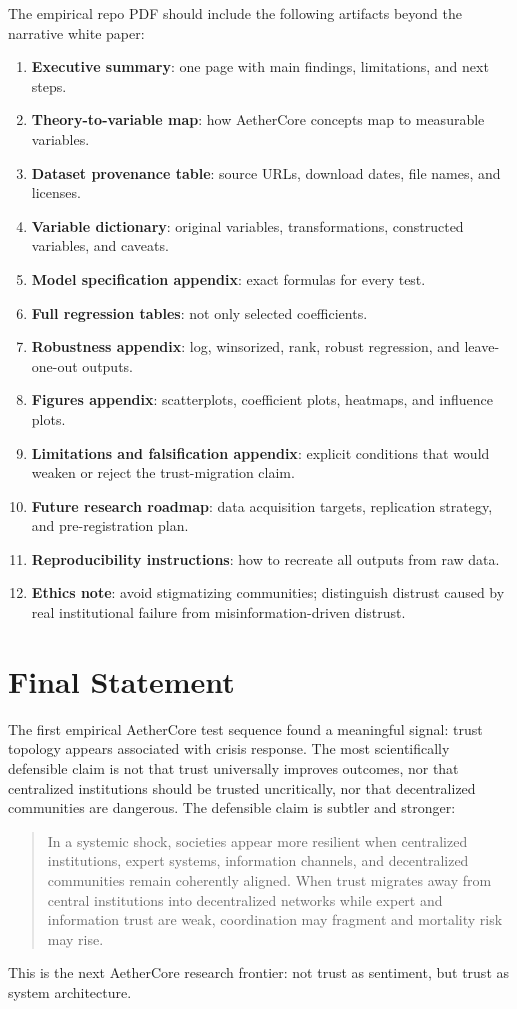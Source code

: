 \documentclass[12pt]{article}
\begin{document}
The empirical repo PDF should include the following artifacts beyond the narrative white paper:

\begin{enumerate}
  \item \textbf{Executive summary}: one page with main findings, limitations, and next steps.
  \item \textbf{Theory-to-variable map}: how AetherCore concepts map to measurable variables.
  \item \textbf{Dataset provenance table}: source URLs, download dates, file names, and licenses.
  \item \textbf{Variable dictionary}: original variables, transformations, constructed variables, and caveats.
  \item \textbf{Model specification appendix}: exact formulas for every test.
  \item \textbf{Full regression tables}: not only selected coefficients.
  \item \textbf{Robustness appendix}: log, winsorized, rank, robust regression, and leave-one-out outputs.
  \item \textbf{Figures appendix}: scatterplots, coefficient plots, heatmaps, and influence plots.
  \item \textbf{Limitations and falsification appendix}: explicit conditions that would weaken or reject the trust-migration claim.
  \item \textbf{Future research roadmap}: data acquisition targets, replication strategy, and pre-registration plan.
  \item \textbf{Reproducibility instructions}: how to recreate all outputs from raw data.
  \item \textbf{Ethics note}: avoid stigmatizing communities; distinguish distrust caused by real institutional failure from misinformation-driven distrust.
\end{enumerate}

\section*{Final Statement}

The first empirical AetherCore test sequence found a meaningful signal: trust topology appears associated with crisis response. The most scientifically defensible claim is not that trust universally improves outcomes, nor that centralized institutions should be trusted uncritically, nor that decentralized communities are dangerous. The defensible claim is subtler and stronger:

\begin{quote}
In a systemic shock, societies appear more resilient when centralized institutions, expert systems, information channels, and decentralized communities remain coherently aligned. When trust migrates away from central institutions into decentralized networks while expert and information trust are weak, coordination may fragment and mortality risk may rise.
\end{quote}

This is the next AetherCore research frontier: not trust as sentiment, but trust as system architecture.
\end{document}
